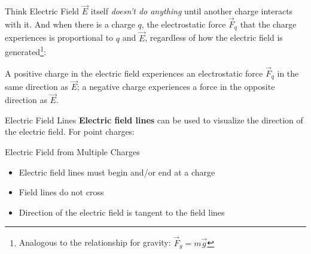 \documentclass[12pt,aspectratio=169]{beamer}
\begin{document}
\begin{frame}{Think Electric Field}
  $\vec E$ itself \emph{doesn't do anything} until another charge interacts with
  it. And when there is a charge $q$, the electrostatic force $\vec F_q$ that
  the charge experiences is proportional to $q$ and $\vec E$, regardless of how
  the electric field is generated\footnote{Analogous to the relationship
  for gravity: $\vec F_g=m\vec g$}:


  A positive charge in the electric field experiences an electrostatic force
  $\vec F_q$ in the same direction as $\vec E$; a negative charge experiences
  a force in the opposite direction as $\vec E$.
\end{frame}



\begin{frame}{Electric Field Lines}
  \textbf{Electric field lines} can be used to visualize the direction of the
  electric field. For point charges:
  \begin{center}
    \hspace{.2in}
  \end{center}
\end{frame}



\begin{frame}{Electric Field from Multiple Charges}
  \begin{center}
  \end{center}
  \begin{itemize}
  \item Electric field lines must begin and/or end at a charge
  \item Field lines do not cross
  \item Direction of the electric field is tangent to the field lines
  \end{itemize}
\end{frame}
\end{document}
